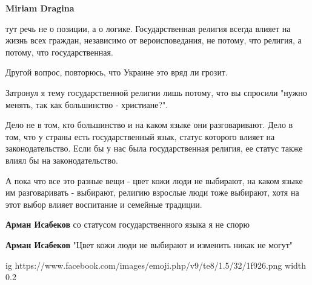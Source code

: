 \begin{itemize}
\begin{itemize}
\textbf{Miriam Dragina} 

тут речь не о позиции, а о логике. Государственная религия всегда влияет на
жизнь всех граждан, независимо от вероисповедания, не потому, что религия, а
потому, что государственная.

Другой вопрос, повторюсь, что Украине это вряд ли грозит.

Затронул я тему государственной религии лишь потому, что вы спросили "нужно
менять, так как большинство - христиане?".

Дело не в том, кто большинство и на каком языке они разговаривают. Дело в том,
что у страны есть государственный язык, статус которого влияет на
законодательство. Если бы у нас была государственная религия, ее статус также
влиял бы на законодательство.

А пока что все это разные вещи - цвет кожи люди не выбирают, на каком языке им
разговаривать - выбирают, религию взрослые люди тоже выбирают, хотя на этот
выбор влияет воспитание и семейные традиции.


 
\textbf{Арман Исабеков} со статусом государственного языка я не спорю

 
\textbf{Арман Исабеков} "Цвет кожи люди не выбирают и изменить никак не могут"
\end{itemize}

 

\ifcmt
  ig https://www.facebook.com/images/emoji.php/v9/te8/1.5/32/1f926.png
  width 0.2
\fi

 

\end{itemize}
